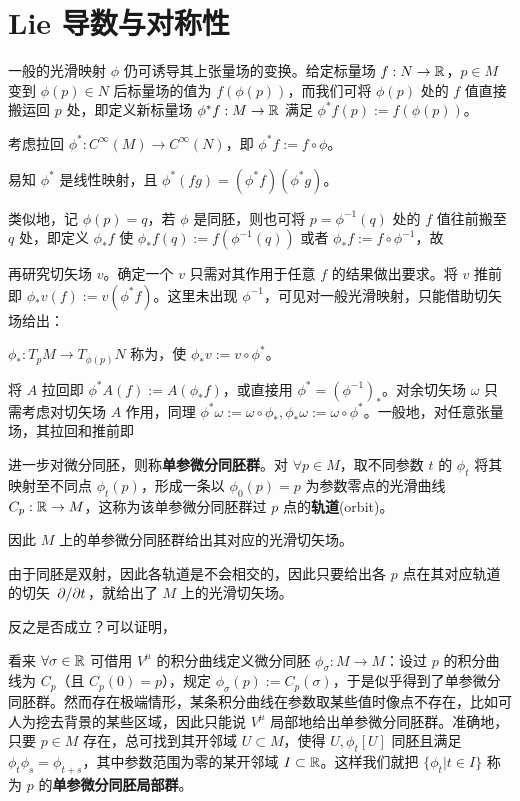 \chapter{Lie 导数与对称性}\label{appx:Lie-deri}

一般的光滑映射 $\phi$ 仍可诱导其上张量场的变换。给定标量场 $f:N\to\mathbb{R}$，$p\in M$ 变到 $\phi(p)\in N$ 后标量场的值为 $f(\phi(p))$，而我们可将 $\phi(p)$ 处的 $f$ 值直接搬运回 $p$ 处，即定义新标量场 $\phi^* f:M\to\mathbb{R}$ 满足 $\phi^* f(p):=f(\phi(p))$。

考虑拉回 $\phi^*:C^\infty(M)\to C^\infty(N)$，即 $\phi^* f:=f\circ\phi$。

\begin{theorem}
    易知 $\phi^*$ 是线性映射，且 $\phi^*(fg)=(\phi^* f) (\phi^* g)$。
\end{theorem}


类似地，记 $\phi(p)=q$，若 $\phi$ 是同胚，则也可将 $p=\phi^{-1}(q)$ 处的 $f$ 值往前搬至 $q$ 处，即定义 $\phi_* f$ 使 $\phi_* f(q):=f(\phi^{-1}(q))$ 或者 $\phi_* f:=f\circ\phi^{-1}$，故

再研究切矢场 $v$。确定一个 $v$ 只需对其作用于任意 $f$ 的结果做出要求。将 $v$ 推前即 $\phi_* v(f):=v(\phi^* f)$。这里未出现 $\phi^{-1}$，可见对一般光滑映射，只能借助切矢场给出：
\begin{definition}
    $\phi_*:T_p M\to T_{\phi(p)}N$ 称为，使 $\phi_* v:=v\circ \phi^*$。
\end{definition}

将 $A$ 拉回即 $\phi^* A(f):=A(\phi_* f)$，或直接用 $\phi^*=(\phi^{-1})_*$。对余切矢场 $\omega$ 只需考虑对切矢场 $A$ 作用，同理 $\phi^* \omega:=\omega\circ\phi_*,\phi_* \omega:=\omega\circ\phi^*$。一般地，对任意张量场，其拉回和推前即



进一步对微分同胚，则称\textbf{单参微分同胚群}。对 $\forall p\in M$，取不同参数 $t$ 的 $\phi_t$ 将其映射至不同点 $\phi_t(p)$，形成一条以 $\phi_0(p)=p$ 为参数零点的光滑曲线 $C_p:\mathbb{R}\to M$，这称为该单参微分同胚群过 $p$ 点的\textbf{轨道}(orbit)。

因此 $M$ 上的单参微分同胚群给出其对应的光滑切矢场。

由于同胚是双射，因此各轨道是不会相交的，因此只要给出各 $p$ 点在其对应轨道的切矢 $\pdv*{t}$，就给出了 $M$ 上的光滑切矢场。

反之是否成立？可以证明，


看来 $\forall \sigma\in\mathbb{R}$ 可借用 $V^\mu$ 的积分曲线定义微分同胚 $\phi_\sigma:M\to M$：设过 $p$ 的积分曲线为 $C_p$（且 $C_p(0)=p$），规定 $\phi_\sigma(p):=C_p(\sigma)$，于是似乎得到了单参微分同胚群。然而存在极端情形，某条积分曲线在参数取某些值时像点不存在，比如可人为挖去背景的某些区域，因此只能说 $V^\mu$ 局部地给出单参微分同胚群。准确地，只要 $p\in M$ 存在，总可找到其开邻域 $U\subset M$，使得 $U,\phi_t[U]$ 同胚且满足$\phi_t\phi_s=\phi_{t+s}$，其中参数范围为零的某开邻域 $I\subset\mathbb{R}$。这样我们就把 $\{\phi_t|t\in I\}$ 称为 $p$ 的\textbf{单参微分同胚局部群}。

